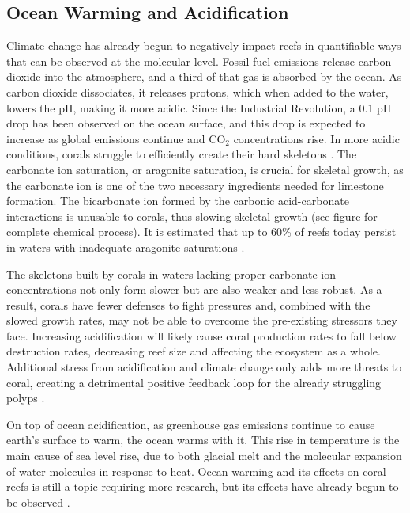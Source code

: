 \documentclass{book}\usepackage{knitr}
\begin{document}
\subsection{Ocean Warming and Acidification}

Climate change has already begun to negatively impact reefs in quantifiable ways that can be observed at the molecular level. Fossil fuel emissions release carbon dioxide into the atmosphere, and a third of that gas is absorbed by the ocean\citep{Keller2009ClimateCC}. As carbon dioxide dissociates, it releases protons, which when added to the water, lowers the pH, making it more acidic. Since the Industrial Revolution, a 0.1 pH drop has been observed on the ocean surface, and this drop is expected to increase as global emissions continue and CO$_2$ concentrations rise. In more acidic conditions, corals struggle to efficiently create their hard skeletons \citep{Keller2009ClimateCC}. The carbonate ion saturation, or aragonite saturation, is crucial for skeletal growth, as the carbonate ion is one of the two necessary ingredients needed for limestone formation. The bicarbonate ion formed by the carbonic acid-carbonate interactions is unusable to corals, thus slowing skeletal growth (see figure for complete chemical process). It is estimated that up to 60\% of reefs today persist in waters with inadequate aragonite saturations \citep{Ayala_2009}.

The skeletons built by corals in waters lacking proper carbonate ion concentrations not only form slower but are also weaker and less robust.  As a result, corals have fewer defenses to fight pressures and, combined with the slowed growth rates, may not be able to overcome the pre-existing stressors they face. Increasing acidification will likely cause coral production rates to fall below destruction rates, decreasing reef size and affecting the ecosystem as a whole. Additional stress from acidification and climate change only adds more threats to coral, creating a detrimental positive feedback loop for the already struggling polyps \citep{Ayala_2009}.

On top of ocean acidification, as greenhouse gas emissions continue to cause earth’s surface to warm, the ocean warms with it. This rise in temperature is the main cause of sea level rise, due to both glacial melt and the molecular expansion of water molecules in response to heat. Ocean warming and its effects on coral reefs is still a topic requiring more research, but its effects have already begun to be observed \citep{wwfindex}.
\end{document}
